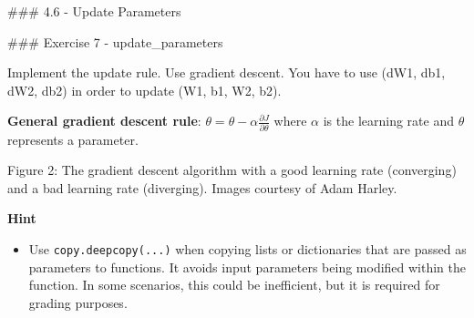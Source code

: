 \documentclass[11pt]{article}
\providecommand{\tightlist}{%
      \setlength{\itemsep}{0pt}\setlength{\parskip}{0pt}}
\begin{document}
    \#\#\# 4.6 - Update Parameters

\#\#\# Exercise 7 - update\_parameters

Implement the update rule. Use gradient descent. You have to use (dW1,
db1, dW2, db2) in order to update (W1, b1, W2, b2).

\textbf{General gradient descent rule}:
\(\theta = \theta - \alpha \frac{\partial J }{ \partial \theta }\) where
\(\alpha\) is the learning rate and \(\theta\) represents a parameter.

Figure 2: The gradient descent algorithm with a good learning rate
(converging) and a bad learning rate (diverging). Images courtesy of
Adam Harley.

\textbf{Hint}

\begin{itemize}
\tightlist
\item
  Use \texttt{copy.deepcopy(...)} when copying lists or dictionaries
  that are passed as parameters to functions. It avoids input parameters
  being modified within the function. In some scenarios, this could be
  inefficient, but it is required for grading purposes.
\end{itemize}
\end{document}
